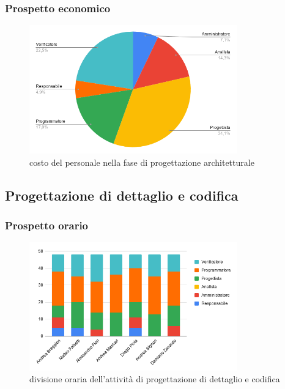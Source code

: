     \subsubsection{Prospetto economico}
    \def\salarycontent{
        {Amministratore,13,20,260},
        {Analista,26,25,650},
        {Progettista,62,22,1364},
        {Programmatore,31,15,465},
        {Responsabile,31,15,465},
        {Verificatore,41,15,615},
        {Totale,182,127,3624},
    }
    
    \begin{figure}[H]
        \centering
        \includegraphics[width=0.8\textwidth]{source/img/architettura_ruoli.png}
        \caption{costo del personale nella fase di progettazione architetturale}
    \end{figure}
\subsection{Progettazione di dettaglio e codifica}
    \subsubsection{Prospetto orario}
    \def\hourlycontent{
        {Andrea Breggion,5,6,0,7,20,10,48},
        {Matteo Falsetti,5,0,0,15,15,13,48},
        {Alessandro Flori,0,4,0,10,18,16,48},
        {Andrea Mascari,0,0,0,14,22,12,48},
        {Diego Piola,5,6,0,9,20,8,48},
        {Andrea Signori,0,0,0,13,22,13,48},
        {Damiano Zanardo,0,6,0,12,20,10,48},
        {Ore totali, 15, 22, 0, 80, 137, 82, 336},
    }
    
    
    \begin{figure}[H]
        \centering
        \includegraphics[width=0.8\textwidth]{source/img/codifica_orari.png}
        \caption{divisione oraria dell'attività di progettazione di dettaglio e codifica}
    \end{figure}
